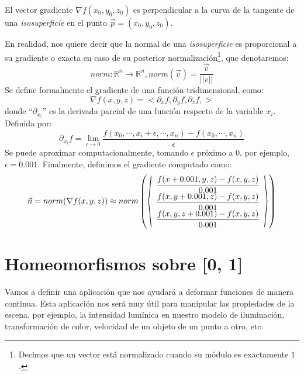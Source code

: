 \begin{theorem}
	El vector gradiente \(\nabla f(x_0, y_0, z_0)\)  es perpendicular a la curva de la tangente de una \textit{isosuperficie} en el punto \(\Vec{p}=(x_0, y_0, z_0)\).
\end{theorem}

En realidad, nos quiere decir que la normal de una \textit{isosuperficie} es proporcional a su gradiente o exacta en caso de su posterior normalización\footnote{Decimos que un vector está normalizado cuando su módulo es exactamente \(1\) .}, que denotaremos:
\[norm:\mathbb{R}^n\longrightarrow\mathbb{R}^n, norm(\Vec{v})=\dfrac{\Vec{v}}{\vert\vert v \vert\vert}\]
Se define formalmente el gradiente de una función tridimensional, como:
\[ \nabla f(x, y, z)= < \partial_x f, \partial_y f, \partial_z f, > \]
donde \enquote{\(\partial_{x_i}\)} es la derivada parcial de una función respecto de la variable \(x_i\). Definida por: 
\[ \partial_{x_i}f=\lim_{\epsilon\longrightarrow 0}\dfrac{f(x_0,\cdots,x_i+\epsilon,\cdots,x_n)-f(x_0, \cdots, x_n)}{\epsilon} \]
Se puede aproximar computacionalmente, tomando \(\epsilon\) próximo a \(0\), por ejemplo, \(\epsilon = 0.001\).
Finalmente, definimos el gradiente computado como:
\[
\Vec{n}=norm(\nabla f(x, y, z))\approx norm\left(
\stretchleftright[1000]{\langle}
{\begin{array}{c}
\dfrac{f(x+0.001,y,z)-f(x,y,z)}{0.001}\\
\dfrac{f(x,y+0.001,z)-f(x,y,z)}{0.001}\\
\dfrac{f(x,y,z+0.001)-f(x,y,z)}{0.001} \end{array}}
{\rangle}\right)
\]

\section{Homeomorfismos sobre [0, 1]}

Vamos a definir una aplicación que nos ayudará a deformar funciones de manera continua. Esta aplicación nos será muy útil para manipular las propiedades de la escena, por ejemplo, la intensidad lumínica en nuestro modelo de iluminación, transformación de color, velocidad de un objeto de un punto a otro, etc.

